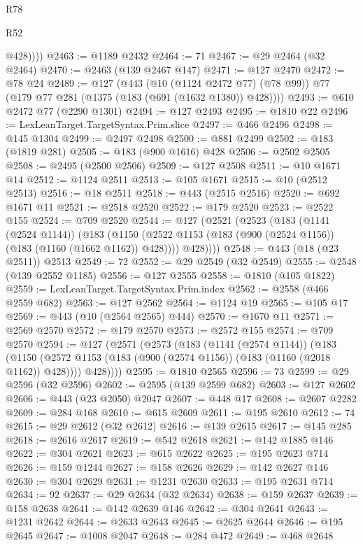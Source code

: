 \begin{lexlean}{R78}
\begin{lexlean}{R52}
\begin{coremodule}
{{{{{{{{{{{{{{{{{{{{{{{{{{{{{{{{{{{{{{{{{{{{{{{{{{{{{{{{{{{{{{{{{{{{{{{{{{{{{{{{{{{{{{{{{{{{{{{{{{{{{{{{{{{{{{{{{{{{{{{{{{{{{{{{{{{{{{{{{{{{{{{{{{{{{{{{{{{{{{{{{{{{{{{{{{{{{{{{{{{{{{{{{{{{{{{{{{{{{{            @428))))
@2463 := @1189 @2432
@2464 := 71
@2467 := @29 @2464 (@32 @2464)
@2470 := @2463 (@139 @2467 @147)
@2471 := @127 @2470
@2472 := @78 @24
@2489 := @127
    (@443
      (@10 (@1124 @2472 @77) (@78 @99))
      @77
      (@179 @77 @281 (@1375 (@183 (@691 (@1632 @1380)) @428))))
@2493 := @610 @2472 @77 (@2290 @1301)
@2494 := @127 @2493
@2495 := @1810 @22
@2496 := LexLeanTarget.TargetSyntax.Prim.slice
@2497 := @466 @2496
@2498 := @145 @1304
@2499 := @2497 @2498
@2500 := @881 @2499
@2502 := @183 (@1819 @281)
@2505 := @183 (@900 @1616) @428
@2506 := @2502 @2505
@2508 := @2495 (@2500 @2506)
@2509 := @127 @2508
@2511 := @10 @1671 @14
@2512 := @1124 @2511
@2513 := @105 @1671
@2515 := @10 (@2512 @2513)
@2516 := @18 @2511
@2518 := @443 (@2515 @2516)
@2520 := @692 @1671 @11
@2521 := @2518 @2520
@2522 := @179 @2520
@2523 := @2522 @155
@2524 := @709 @2520
@2544 := @127
    (@2521
      (@2523
        (@183
          (@1141 (@2524 @1144))
          (@183
            (@1150 (@2522 @1153 (@183 (@900 (@2524 @1156)) (@183 (@1160 (@1662 @1162)) @428))))
            @428))))
@2548 := @443 (@18 (@23 @2511)) @2513
@2549 := 72
@2552 := @29 @2549 (@32 @2549)
@2555 := @2548 (@139 @2552 @1185)
@2556 := @127 @2555
@2558 := @1810 (@105 @1822)
@2559 := LexLeanTarget.TargetSyntax.Prim.index
@2562 := @2558 (@466 @2559 @682)
@2563 := @127 @2562
@2564 := @1124 @19
@2565 := @105 @17
@2569 := @443 (@10 (@2564 @2565) @444)
@2570 := @1670 @11
@2571 := @2569 @2570
@2572 := @179 @2570
@2573 := @2572 @155
@2574 := @709 @2570
@2594 := @127
    (@2571
      (@2573
        (@183
          (@1141 (@2574 @1144))
          (@183
            (@1150 (@2572 @1153 (@183 (@900 (@2574 @1156)) (@183 (@1160 (@2018 @1162)) @428))))
            @428))))
@2595 := @1810 @2565
@2596 := 73
@2599 := @29 @2596 (@32 @2596)
@2602 := @2595 (@139 @2599 @682)
@2603 := @127 @2602
@2606 := @443 (@23 @2050) @2047
@2607 := @448 @17
@2608 := @2607 @2282
@2609 := @284 @168
@2610 := @615 @2609
@2611 := @195 @2610
@2612 := 74
@2615 := @29 @2612 (@32 @2612)
@2616 := @139 @2615
@2617 := @145 @285
@2618 := @2616 @2617
@2619 := @542 @2618
@2621 := @142 @1885 @146
@2622 := @304 @2621
@2623 := @615 @2622
@2625 := @195 @2623 @714
@2626 := @159 @1244
@2627 := @158 @2626
@2629 := @142 @2627 @146
@2630 := @304 @2629
@2631 := @1231 @2630
@2633 := @195 @2631 @714
@2634 := 92
@2637 := @29 @2634 (@32 @2634)
@2638 := @159 @2637
@2639 := @158 @2638
@2641 := @142 @2639 @146
@2642 := @304 @2641
@2643 := @1231 @2642
@2644 := @2633 @2643
@2645 := @2625 @2644
@2646 := @195 @2645
@2647 := @1008 @2047
@2648 := @284 @472
@2649 := @468 @2648
}}}}}}}}}}}}}}}}}}}}}}}}}}}}}}}}}}}}}}}}}}}}}}}}}}}}}}}}}}}}}}}}}}}}}}}}}}}}}}}}}}}}}}}}}}}}}}}}}}}}}}}}}}}}}}}}}}}}}}}}}}}}}}}}}}}}}}}}}}}}}}}}}}}}}}}}}}}}}}}}}}}}}}}}}}}}}}}}}}}}}}}}}}}}}}}}}}}}}}
\end{coremodule}
\end{lexlean}
\end{lexlean}
